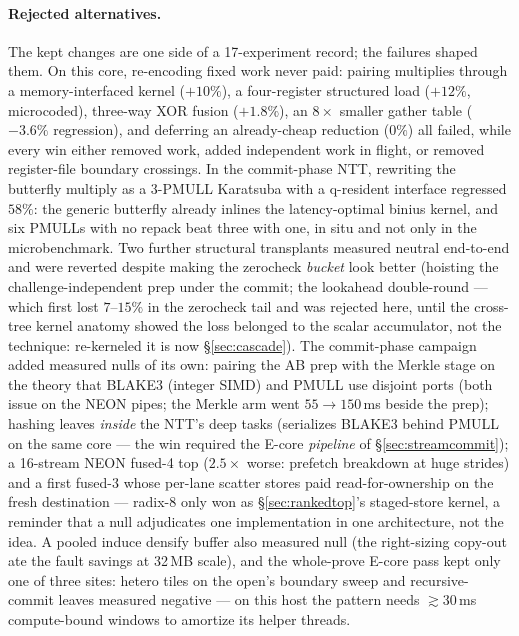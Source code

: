 \documentclass[11pt]{article}
\begin{document}
\paragraph{Rejected alternatives.}
The kept changes are one side of a 17-experiment record; the failures shaped
them. On this core, re-encoding fixed work never paid: pairing multiplies
through a memory-interfaced kernel ($+10\%$), a four-register structured load
($+12\%$, microcoded), three-way XOR fusion ($+1.8\%$), an $8\times$ smaller
gather table ($-3.6\%$ regression), and deferring an already-cheap reduction
($0\%$) all failed, while every win either removed work, added independent
work in flight, or removed register-file boundary crossings. In the
commit-phase NTT, rewriting the butterfly multiply as a $3$-PMULL Karatsuba
with a q-resident interface regressed $58\%$: the generic butterfly already
inlines the latency-optimal binius kernel, and six PMULLs with no repack beat
three with one, in situ and not only in the microbenchmark. Two further
structural transplants measured neutral end-to-end and were reverted despite
making the zerocheck \emph{bucket} look better (hoisting the challenge-independent
prep under the commit; the lookahead double-round --- which first lost $7$--$15\%$ in the
zerocheck tail and was rejected here, until the cross-tree kernel anatomy
showed the loss belonged to the scalar accumulator, not the technique:
re-kerneled it is now \S\ref{sec:cascade}). The commit-phase campaign
added measured nulls of its own: pairing the AB prep with the Merkle
stage on the theory that BLAKE3 (integer SIMD) and PMULL use disjoint
ports (both issue on the NEON pipes; the Merkle arm went $55\to150\,$ms
beside the prep); hashing leaves \emph{inside} the NTT's deep tasks
(serializes BLAKE3 behind PMULL on the same core — the win required the
E-core \emph{pipeline} of \S\ref{sec:streamcommit}); a 16-stream NEON
fused-4 top ($2.5\times$ worse: prefetch breakdown at huge strides) and
a first fused-3 whose per-lane scatter stores paid read-for-ownership on
the fresh destination — radix-8 only won as \S\ref{sec:rankedtop}'s
staged-store kernel, a reminder that a null adjudicates one
implementation in one architecture, not the idea. A pooled induce
densify buffer also measured null (the right-sizing copy-out ate the
fault savings at 32\,MB scale), and the whole-prove E-core pass kept
only one of three sites: hetero tiles on the open's boundary sweep and
recursive-commit leaves measured negative --- on this host the pattern
needs $\gtrsim$30\,ms compute-bound windows to amortize its helper
threads.
\end{document}
